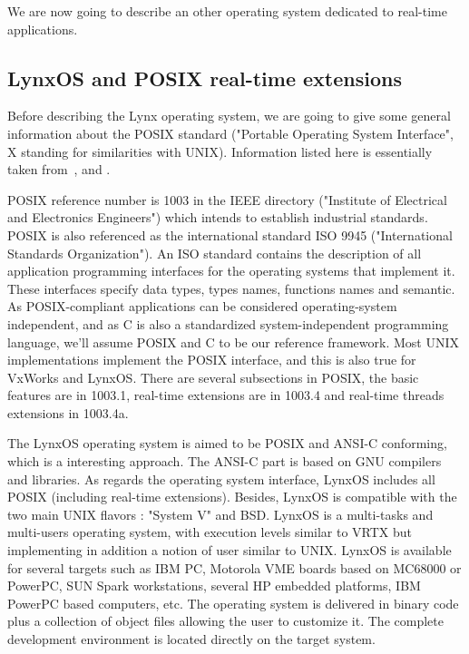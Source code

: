 \documentclass[10pt]{report}
\begin{document}
We are now going to describe an other operating system dedicated
to real-time applications.

\subsection{LynxOS and POSIX real-time extensions}

Before describing the Lynx operating system, we are going to give
some general information about the POSIX standard ("Portable
Operating System Interface", X standing for similarities with
UNIX). Information listed here is essentially taken from~\cite{LYNX}, \cite{JMR:93} and \cite{JMR:94}.

POSIX reference number is 1003 in the IEEE directory ("Institute
of Electrical and Electronics Engineers") which intends to
establish industrial standards. POSIX is also referenced as the
international standard ISO 9945 ("International Standards
Organization"). An ISO standard contains the description of all
application programming interfaces for the operating systems that
implement it. These interfaces specify data types, types names,
functions names and semantic. As POSIX-compliant applications can
be considered operating-system independent, and as C is also a
standardized system-independent programming language, we'll
assume POSIX and C to be our reference framework. Most UNIX
implementations implement the POSIX interface, and this is also
true for VxWorks and LynxOS. There are several subsections in
POSIX, the basic features are in 1003.1, real-time extensions are
in 1003.4 and real-time threads extensions in 1003.4a.

The LynxOS operating system is aimed to be POSIX and ANSI-C
conforming, which is a interesting approach. The ANSI-C part is
based on GNU compilers and libraries. As regards the operating
system interface, LynxOS includes all POSIX (including real-time
extensions). Besides, LynxOS is compatible with the two main UNIX
flavors : "System V" and BSD. LynxOS is a multi-tasks and
multi-users operating system, with execution levels similar to
VRTX but implementing in addition a notion of user similar to
UNIX. LynxOS is available for several targets such as IBM PC,
Motorola VME boards based on MC68000 or PowerPC, SUN Spark
workstations, several HP embedded platforms, IBM PowerPC based
computers, etc. The operating system is delivered in binary code
plus a collection of object files allowing the user to customize
it. The complete development environment is located directly on
the target system.
\end{document}
